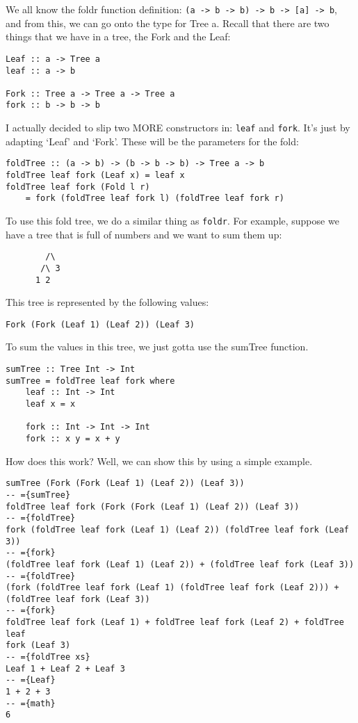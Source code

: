 \documentclass[11pt,a4paper,titlepage]{scrartcl}
\begin{document}
We all know the foldr function definition: 
\lstinline|(a -> b -> b) -> b -> [a] -> b|, and from this, we can go onto
the type for Tree a. Recall that there are two things that we have in a
tree, the Fork and the Leaf:
\begin{lstlisting}
Leaf :: a -> Tree a
leaf :: a -> b

Fork :: Tree a -> Tree a -> Tree a
fork :: b -> b -> b
\end{lstlisting}

I actually decided to slip two MORE constructors in: \lstinline|leaf| and
\lstinline|fork|. It's just by adapting `Leaf' and `Fork'. These will be
the parameters for the fold:

\begin{lstlisting}
foldTree :: (a -> b) -> (b -> b -> b) -> Tree a -> b
foldTree leaf fork (Leaf x) = leaf x
foldTree leaf fork (Fold l r)
    = fork (foldTree leaf fork l) (foldTree leaf fork r)
\end{lstlisting}

To use this fold tree, we do a similar thing as \lstinline|foldr|. For
example, suppose we have a tree that is full of numbers and we want to sum
them up:
\begin{lstlisting}
        /\
       /\ 3
      1 2
\end{lstlisting}
This tree is represented by the following values:
\begin{lstlisting}
Fork (Fork (Leaf 1) (Leaf 2)) (Leaf 3)
\end{lstlisting}
To sum the values in this tree, we just gotta use the sumTree function.
\begin{lstlisting}
sumTree :: Tree Int -> Int
sumTree = foldTree leaf fork where
    leaf :: Int -> Int
    leaf x = x

    fork :: Int -> Int -> Int
    fork :: x y = x + y
\end{lstlisting}
How does this work? Well, we can show this by using a simple example.
\begin{lstlisting}
sumTree (Fork (Fork (Leaf 1) (Leaf 2)) (Leaf 3))
-- ={sumTree}
foldTree leaf fork (Fork (Fork (Leaf 1) (Leaf 2)) (Leaf 3))
-- ={foldTree}
fork (foldTree leaf fork (Leaf 1) (Leaf 2)) (foldTree leaf fork (Leaf 3))
-- ={fork}
(foldTree leaf fork (Leaf 1) (Leaf 2)) + (foldTree leaf fork (Leaf 3))
-- ={foldTree}
(fork (foldTree leaf fork (Leaf 1) (foldTree leaf fork (Leaf 2))) +
(foldTree leaf fork (Leaf 3))
-- ={fork}
foldTree leaf fork (Leaf 1) + foldTree leaf fork (Leaf 2) + foldTree leaf
fork (Leaf 3)
-- ={foldTree xs}
Leaf 1 + Leaf 2 + Leaf 3
-- ={Leaf}
1 + 2 + 3
-- ={math}
6
\end{lstlisting}
\end{document}
